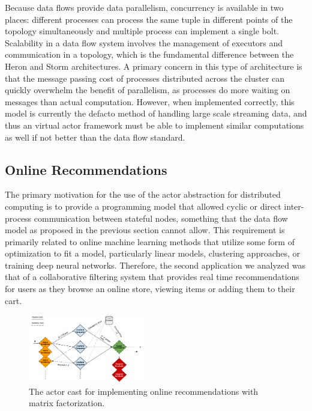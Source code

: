 \documentclass[conference,twocolumn,10pt]{IEEEtran}
\begin{document}
Because data flows provide data parallelism, concurrency is available in two places: different processes can process the same tuple in different points of the topology simultaneously and multiple process can implement a single bolt. Scalability in a data flow system involves the management of executors and communication in a topology, which is the fundamental difference between the Heron and Storm architectures. A primary concern in this type of architecture is that the message passing cost of processes distributed across the cluster can quickly overwhelm the benefit of parallelism, as processes do more waiting on messages than actual computation. However, when implemented correctly, this model is currently the defacto method of handling large scale streaming data, and thus an virtual actor framework must be able to implement similar computations as well if not better than the data flow standard.

\subsection{Online Recommendations}

The primary motivation for the use of the actor abstraction for distributed computing is to provide a programming model that allowed cyclic or direct inter-process communication between stateful nodes, something that the data flow model as proposed in the previous section cannot allow. This requirement is primarily related to online machine learning methods that utilize some form of optimization to fit a model, particularly linear models, clustering approaches, or training deep neural networks. Therefore, the second application we analyzed was that of a collaborative filtering system that provides real time recommendations for users as they browse an online store, viewing items or adding them to their cart.

\begin{figure}[!t]
    \centering
    \includegraphics[width=0.45\textwidth]{nnmf_cast}
    \caption{The actor cast for implementing online recommendations with matrix factorization.}
    \label{fig:nnmf_cast}
\end{figure}
\end{document}
